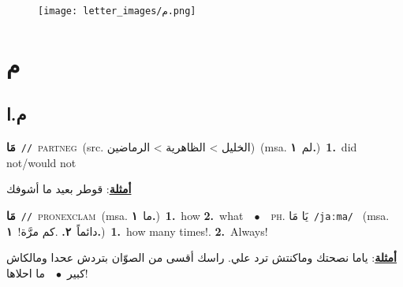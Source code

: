 \documentclass[10pt,a4paper,twoside]{article} %
\begin{document}
\begin{figure*}[t!]\centering\texttt{[image: letter\_images/م.png]}\end{figure*}
\color{white}

 \section*{\foreignlanguage{arabic}{م}} 
 \begin{multicols}{2} 

%
\color{black}
\vspace{-3mm}
\subsection*{\color{blue}\foreignlanguage{arabic}{م.ا}\color{blue}{ (ntws)}} 

{\setlength\topsep{0pt}\textbf{\foreignlanguage{arabic}{مَا}}\ {\color{gray}\texttt{//}\color{black}}\ \textsc{part\textunderscore neg}\ (src. \color{gray}\foreignlanguage{arabic}{الخليل > الظاهرية > الرماضين}\color{black})\ \color{gray}(msa. \foreignlanguage{arabic}{لم}~\foreignlanguage{arabic}{\textbf{١.}})\color{black}\ \textbf{1.}~did not/would not\  \begin{flushright}\color{gray}\foreignlanguage{arabic}{\textbf{\underline{\foreignlanguage{arabic}{أمثلة}}}: قوطر بعيد ما أشوفك}\end{flushright}\color{black}} \vspace{2mm}

{\setlength\topsep{0pt}\textbf{\foreignlanguage{arabic}{مَا}}\ {\color{gray}\texttt{//}\color{black}}\ \textsc{pron\textunderscore exclam}\ \color{gray}(msa. \foreignlanguage{arabic}{ما}~\foreignlanguage{arabic}{\textbf{١.}})\color{black}\ \textbf{1.}~how  \textbf{2.}~what\ \ $\bullet$\ \ \textsc{ph.} \color{gray} \foreignlanguage{arabic}{يَا مَا}\color{black}\ {\color{gray}\texttt{/{\sffamily jaːma}/}\color{black}}\ \color{gray} (msa. \foreignlanguage{arabic}{دائماً}~\foreignlanguage{arabic}{\textbf{٢.}}  .\foreignlanguage{arabic}{كم مرَّة!}~\foreignlanguage{arabic}{\textbf{١.}})\color{black}\ \textbf{1.}~how many times!.  \textbf{2.}~Always!\  \begin{flushright}\color{gray}\foreignlanguage{arabic}{\textbf{\underline{\foreignlanguage{arabic}{أمثلة}}}: ياما نصحتك وماكنتش ترد علي. راسك أقسى من الصوّان بتردش عحدا ومالكاش كبير\ $\bullet$\ \  ما احلاها!}\end{flushright}\color{black}} \vspace{2mm}


\end{multicols}
\end{document}
